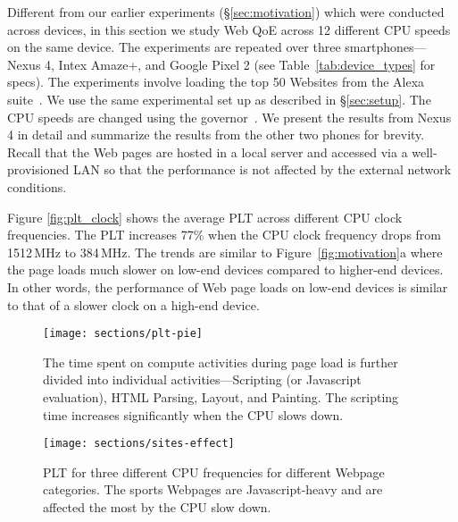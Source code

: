 Different from our earlier experiments (\S\ref{sec:motivation}) which were conducted across devices, in this section we study Web QoE  across 12 different CPU speeds on the same device. The experiments are repeated over three smartphones---Nexus 4, Intex Amaze+, and Google Pixel 2 (see Table~\ref{tab:device_types} for specs). The experiments involve loading the top 50 Websites from the Alexa suite~\cite{alexa}.  We use the 
same experimental set up as described in \S\ref{sec:setup}. The CPU speeds are changed using the governor~\cite{ad-governors}. We present the results from Nexus\,4 in detail and summarize the results from the other two phones for brevity.
%
Recall that the Web pages are hosted in a local server and accessed via a well-provisioned LAN so that the performance is not affected by the external network conditions. 


Figure \ref{fig:plt_clock} shows the average PLT across different CPU clock frequencies. The PLT increases 77\% when the CPU clock frequency drops from 1512\,MHz to 384\,MHz. The trends are similar to Figure~\ref{fig:motivation}a where the page loads much slower on low-end devices compared to higher-end devices. In other words, the performance of Web page loads on low-end devices is similar to that of a slower clock on a high-end device. 

\begin{figure}[t]
  \centering
  \texttt{[image: sections/plt-pie]}
  \caption{The time spent on compute activities during page load is further divided into individual activities---Scripting (or Javascript evaluation), HTML Parsing, Layout, and Painting. The scripting time increases significantly when the CPU slows down.  }
  \label{fig:dissect}
\end{figure}

\begin{figure}[t]
  \centering
  \texttt{[image: sections/sites-effect]}
  \caption{PLT for three different CPU frequencies for different Webpage categories. The sports Webpages are Javascript-heavy and are affected the most by the CPU 
  slow down.    }
  \vspace{-0.2in}
  \label{fig:sites-effect}
\end{figure}

